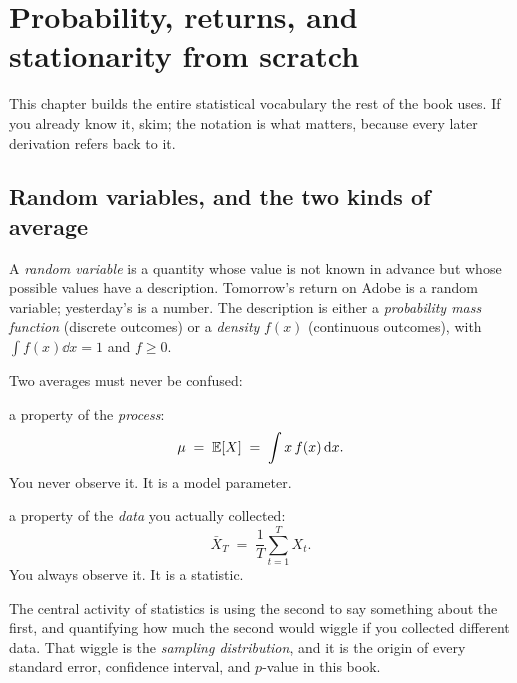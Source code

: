 \section{Probability, returns, and stationarity from scratch}
\label{ch:probability}

This chapter builds the entire statistical vocabulary the rest of the book uses. If you
already know it, skim; the notation is what matters, because every later derivation
refers back to it.

\subsection{Random variables, and the two kinds of average}
\label{sec:prob:rv}

A \emph{random variable} is a quantity whose value is not known in advance but whose
possible values have a description. Tomorrow's return on Adobe is a random variable;
yesterday's is a number. The description is either a \emph{probability mass function}
(discrete outcomes) or a \emph{density} $f(x)$ (continuous outcomes), with
$\int f(x)\dd x = 1$ and $f\ge 0$.

Two averages must never be confused:

\begin{description}[leftmargin=0pt,style=nextline]
  \item[The population mean (expectation)] a property of the \emph{process}:
    \begin{equation}
      \mu \;=\; \mathbb{E}[X] \;=\; \int x\, f(x)\,\mathrm{d} x .
      \label{eq:expectation}
    \end{equation}
    You never observe it. It is a model parameter.
  \item[The sample mean] a property of the \emph{data} you actually collected:
    \begin{equation}
      \bar X_T \;=\; \frac{1}{T}\sum_{t=1}^{T}X_t .
      \label{eq:samplemean}
    \end{equation}
    You always observe it. It is a statistic.
\end{description}

The central activity of statistics is using the second to say something about the first,
and quantifying how much the second would wiggle if you collected different data. That
wiggle is the \emph{sampling distribution}, and it is the origin of every standard
error, confidence interval, and $p$-value in this book.

